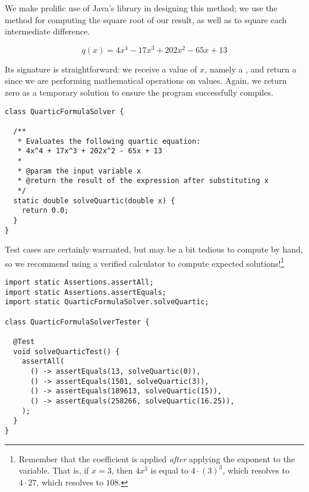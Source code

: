 We make prolific use of Java's  library in designing this method; we use the  method for computing the square root of our result, as well as  to square each intermediate difference.


\[
q(x) = 4x^4 - 17x^3 + 202x^2 - 65x + 13
\]

Its signature is straightforward: we receive a value of $x$, namely a , and return a  since we are performing mathematical operations on  values. Again, we return zero as a temporary solution to ensure the program successfully compiles.
 
\begin{cl}{}
\begin{lstlisting}[language=MyJava]
class QuarticFormulaSolver {

  /**
   * Evaluates the following quartic equation:
   * 4x^4 + 17x^3 + 202x^2 - 65x + 13
   *
   * @param the input variable x
   * @return the result of the expression after substituting x
   */
  static double solveQuartic(double x) {
    return 0.0;
  }
}
\end{lstlisting}
\end{cl}

Test cases are certainly warranted, but may be a bit tedious to compute by hand, so we recommend using a verified calculator to compute expected solutions!\footnote{Remember that the coefficient is applied \textit{after} applying the exponent to the variable. That is, if $x=3$, then $4x^3$ is equal to $4 \cdot (3)^3$, which resolves to $4 \cdot 27$, which resolves to $108$.}

\begin{cl}{}
\begin{lstlisting}[language=MyJava]
import static Assertions.assertAll;
import static Assertions.assertEquals;
import static QuarticFormulaSolver.solveQuartic;

class QuarticFormulaSolverTester {

  @Test
  void solveQuarticTest() {
    assertAll(
      () -> assertEquals(13, solveQuartic(0)),
      () -> assertEquals(1501, solveQuartic(3)),
      () -> assertEquals(189613, solveQuartic(15)),
      () -> assertEquals(258266, solveQuartic(16.25)),
    );
  }
}
\end{lstlisting}
\end{cl}

